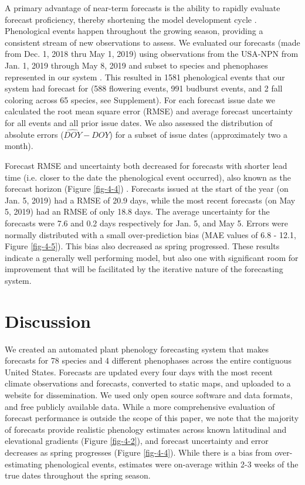 A primary advantage of near-term forecasts is the ability to rapidly evaluate forecast proficiency, thereby shortening the model development cycle \citep{dietze2018}. Phenological events happen throughout the growing season, providing a consistent stream of new observations to assess. We evaluated our forecasts (made from Dec. 1, 2018 thru May 1, 2019) using observations from the USA-NPN from Jan. 1, 2019 through May 8, 2019 and subset to species and phenophases represented in our system \citep{npndata2019}. This resulted in 1581 phenological events that our system had forecast for (588 flowering events, 991 budburst events, and 2 fall coloring across 65 species, see Supplement). For each forecast issue date we calculated the root mean square error (RMSE) and average forecast uncertainty for all events and all prior issue dates. We also assessed the distribution of absolute errors ($\widehat{DOY} - DOY$) for a subset of issue dates (approximately two a month).

Forecast RMSE and uncertainty both decreased for forecasts with shorter lead time (i.e. closer to the date the phenological event occurred), also known as the forecast horizon (Figure \ref{fig-4-4}) \citep{petchey2015}. Forecasts issued at the start of the year (on Jan. 5, 2019) had a RMSE of 20.9 days, while the most recent forecasts (on May 5, 2019) had an RMSE of only 18.8 days. The average uncertainty for the forecasts were 7.6 and 0.2 days respectively for Jan. 5, and May 5. Errors were normally distributed with a small over-prediction bias (MAE values of 6.8 - 12.1, Figure \ref{fig-4-5}). This bias also decreased as spring progressed. These results indicate a generally well performing model, but also one with significant room for improvement that will be facilitated by the iterative nature of the forecasting system.

\section{Discussion}

We created an automated plant phenology forecasting system that makes forecasts for 78 species and 4 different phenophases across the entire contiguous United States. Forecasts are updated every four days with the most recent climate observations and forecasts, converted to static maps, and uploaded to a website for dissemination. We used only open source software and data formats, and free publicly available data. While a more comprehensive evaluation of forecast performance is outside the scope of this paper, we note that the majority of forecasts provide realistic phenology estimates across known latitudinal and elevational gradients (Figure \ref{fig-4-2}), and forecast uncertainty and error decreases as spring progresses (Figure \ref{fig-4-4}). While there is a bias from over-estimating phenological events, estimates were on-average within 2-3 weeks of the true dates throughout the spring season.  

